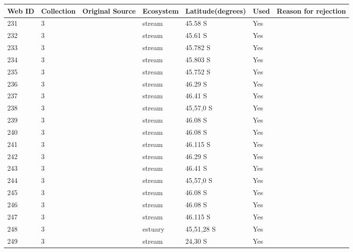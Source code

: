 \documentclass[12pt]{article}
\begin{document}
\begin{landscape}
    \begin{table}[h!]
    \centering
    {\footnotesize
      \begin{tabular}{p{2.8cm}p{1.3cm}p{3cm}p{2.2cm}p{2.5cm}lp{8.2cm}}
        \hline
        Web ID & Collection & Original Source & Ecosystem & Latitude(degrees) & Used  & Reason for rejection  \\
        \hline
        231   & 3 & \cite{Thompson2004c}  & stream & 45.58 S & Yes   &       \\
        232   & 3 & \cite{Thompson2004c}  & stream & 45.61 S & Yes   &       \\
        233   & 3 & \cite{Thompson2004c}  & stream & 45.782 S & Yes   &       \\
        234   & 3 & \cite{Thompson2004c}  & stream & 45.803 S & Yes   &       \\
        235   & 3 & \cite{Thompson2004c}  & stream & 45.752 S & Yes   &       \\
        236   & 3 & \cite{Thompson2004c}  & stream & 46.29 S & Yes   &       \\
        237   & 3 & \cite{Thompson2004c}  & stream & 46.41 S & Yes   &       \\
        238   & 3 & \cite{Thompson2004c}  & stream & 45,57,0 S & Yes   &       \\
        239   & 3 & \cite{Thompson2004c}  & stream & 46.08 S & Yes   &       \\
        240   & 3 & \cite{Thompson2004c}  & stream & 46.08 S & Yes   &       \\
        241   & 3 & \cite{Thompson2004c}  & stream & 46.115 S & Yes   &       \\
        242   & 3 & \cite{Thompson2004c}  & stream & 46.29 S & Yes   &       \\
        243   & 3 & \cite{Thompson2004c}  & stream & 46.41 S & Yes   &       \\
        244   & 3 & \cite{Thompson2004c}  & stream & 45,57,0 S & Yes   &       \\
        245   & 3 & \cite{Thompson2004c}  & stream & 46.08 S & Yes   &       \\
        246   & 3 & \cite{Thompson2004c}  & stream & 46.08 S & Yes   &       \\
        247   & 3 & \cite{Thompson2004c}  & stream & 46.115 S & Yes   &       \\
        248   & 3 & \cite{Thompson2004}  & estuary & 45,51,28 S & Yes   &        \\
        249   & 3 & \cite{Angelini2005}  & stream & 24,30 S & Yes   &       \\

\end{tabular}}
\end{table}
\end{landscape}
\end{document}
